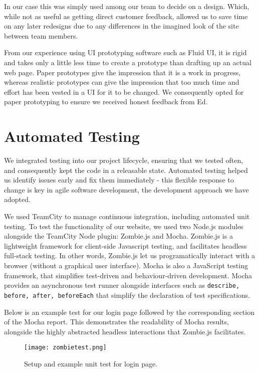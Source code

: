 In our case this was simply used among our team to decide on a design. Which, while not as useful as getting direct customer feedback, allowed us to save time on any later redesigns due to any differences in the imagined look of the site between team members. 

From our experience using UI prototyping software such as Fluid UI, it is rigid and takes only a little less time to create a prototype than drafting up an actual web page. Paper prototypes give the impression that it is a work in progress, whereas realistic prototypes can give the impression that too much time and effort has been vested in a UI for it to be changed. We consequently opted for paper prototyping to ensure we received honest feedback from Ed.


\section{Automated Testing}

We integrated testing into our project lifecycle, ensuring that we tested often, and consequently kept the code in a releasable state. Automated testing helped us identify issues early and fix them immediately - this flexible response to change is key in agile software development, the development approach we have adopted. 

We used TeamCity\cite{teamcity} to manage continuous integration, including automated unit testing. To test the functionality of our website, we used two Node.js modules alongside the TeamCity Node plugin\cite{teamcitynode}: Zombie.js\cite{zombie} and Mocha\cite{mocha}. Zombie.js is a lightweight framework for client-side Javascript testing, and facilitates headless full-stack testing. In other words, Zombie.js let us programatically interact with a browser (without a graphical user interface). Mocha is also a JavaScript testing framework, that simplifies test-driven and behaviour-driven development. Mocha provides an asynchronous test runner alongside interfaces such as {\tt describe, before, after, beforeEach} that simplify the declaration of test specifications.

Below is an example test for our login page followed by the corresponding section of the Mocha report. This demonstrates the readability of Mocha results, alongside the highly abstracted headless interactions that Zombie.js facilitates.  

\begin{figure}[H]
\centering
\texttt{[image: zombietest.png]}
\caption{Setup and example unit test for login page.}
\end{figure}

